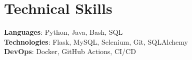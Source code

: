 \section{Technical Skills}
    \begin{itemize}[leftmargin=0.15in, label={}]
	\small{\item{
		\textbf{Languages}{: Python, Java, Bash, SQL} \\
		\textbf{Technologies}{: Flask, MySQL, Selenium, Git, SQLAlchemy} \\
		\textbf{DevOps}{: Docker, GitHub Actions, CI/CD}
	}}
    \end{itemize}
